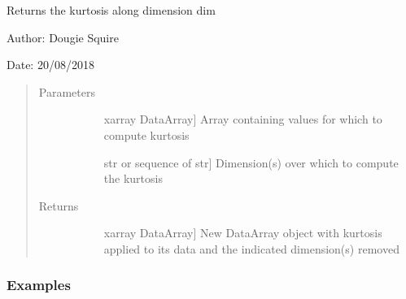 \documentclass[letterpaper,10pt,english]{sphinxmanual}
\begin{document}
\begin{fulllineitems}
\label{\detokenize{utils_doc:utils.kurtosis}}
Returns the kurtosis along dimension dim

\begin{DUlineblock}{0em}
\item[] Author: Dougie Squire
\item[] Date: 20/08/2018
\end{DUlineblock}
\begin{quote}\begin{description}
\item[{Parameters}] \leavevmode\begin{description}
\item[{}] \leavevmode{[}xarray DataArray{]}
Array containing values for which to compute kurtosis

\item[{}] \leavevmode{[}str or sequence of str{]}
Dimension(s) over which to compute the kurtosis

\end{description}

\item[{Returns}] \leavevmode\begin{description}
\item[{}] \leavevmode{[}xarray DataArray{]}
New DataArray object with kurtosis applied to its data and the indicated dimension(s) removed

\end{description}

\end{description}\end{quote}
\subsubsection*{Examples}


\end{fulllineitems}
\end{document}
